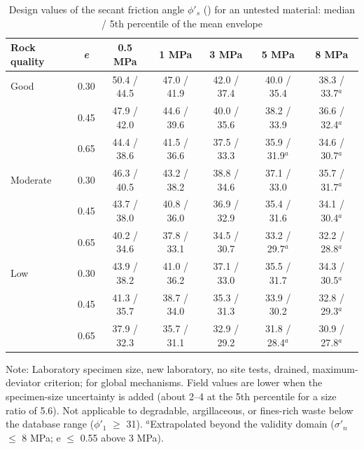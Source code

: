\documentclass[Journal,letterpaper]{ascelike-new}
\begin{document}
\begin{table}
\caption{Design values of the secant friction angle $\phi'_s$ (\textdegree{}) for an untested material: median / 5th percentile of the mean envelope}
\label{tab:3}
\centering\small
\renewcommand{\arraystretch}{1.15}
\begin{tabular}{lcccccc}
\hline\hline
Rock quality & \textit{e} & 0.5 MPa & 1 MPa & 3 MPa & 5 MPa & 8 MPa \\
\hline
Good & 0.30 & 50.4 / 44.5 & 47.0 / 41.9 & 42.0 / 37.4 & 40.0 / 35.4 & 38.3 / 33.7$^{a}$ \\
 & 0.45 & 47.9 / 42.0 & 44.6 / 39.6 & 40.0 / 35.6 & 38.2 / 33.9 & 36.6 / 32.4$^{a}$ \\
 & 0.65 & 44.4 / 38.6 & 41.5 / 36.6 & 37.5 / 33.3 & 35.9 / 31.9$^{a}$ & 34.6 / 30.7$^{a}$ \\
Moderate & 0.30 & 46.3 / 40.5 & 43.2 / 38.2 & 38.8 / 34.6 & 37.1 / 33.0 & 35.7 / 31.7$^{a}$ \\
 & 0.45 & 43.7 / 38.0 & 40.8 / 36.0 & 36.9 / 32.9 & 35.4 / 31.6 & 34.1 / 30.4$^{a}$ \\
 & 0.65 & 40.2 / 34.6 & 37.8 / 33.1 & 34.5 / 30.7 & 33.2 / 29.7$^{a}$ & 32.2 / 28.8$^{a}$ \\
Low & 0.30 & 43.9 / 38.2 & 41.0 / 36.2 & 37.1 / 33.0 & 35.5 / 31.7 & 34.3 / 30.5$^{a}$ \\
 & 0.45 & 41.3 / 35.7 & 38.7 / 34.0 & 35.3 / 31.3 & 33.9 / 30.2 & 32.8 / 29.3$^{a}$ \\
 & 0.65 & 37.9 / 32.3 & 35.7 / 31.1 & 32.9 / 29.2 & 31.8 / 28.4$^{a}$ & 30.9 / 27.8$^{a}$ \\
\hline\hline
\end{tabular}
\par\vspace{4pt}\parbox{\linewidth}{\footnotesize Note: Laboratory specimen size, new laboratory, no site tests, drained, maximum-deviator criterion; for global mechanisms. Field values are lower when the specimen-size uncertainty is added (about 2--4\textdegree{} at the 5th percentile for a size ratio of 5.6). Not applicable to degradable, argillaceous, or fines-rich waste below the database range ($\phi'_1$ $\ge$ 31\textdegree{}). $^{a}$Extrapolated beyond the validity domain ($\sigma'_n$ $\le$ 8 MPa; e $\le$ 0.55 above 3 MPa).}
\end{table}
\end{document}
